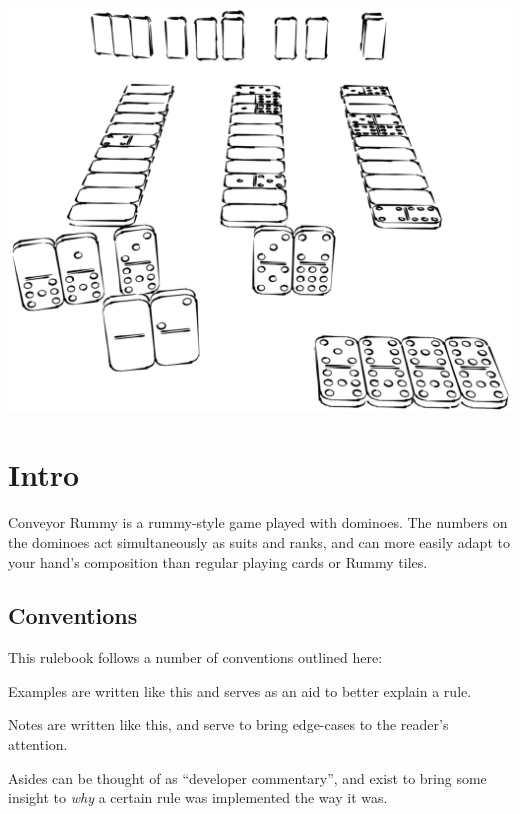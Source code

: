 


\maketitle

\noindent\includegraphics[width = \linewidth]{graphics/dominoes-gameplay.png}
\newpage
\section*{Intro}
Conveyor Rummy is a rummy-style game played with dominoes. 
The numbers on the dominoes act simultaneously as suits and ranks, and can more easily adapt to your hand's composition than regular playing cards or Rummy tiles.

\subsection*{Conventions}
This rulebook follows a number of conventions outlined here:

\example Examples are written like this and serves as an aid to better explain a rule.

\note Notes are written like this, and serve to bring edge-cases to the reader's attention.

\aside Asides can be thought of as ``developer commentary'', and exist to bring some insight to \textit{why} a certain rule was implemented the way it was.
\newpage
\tableofcontents
\newpage







\newpage


